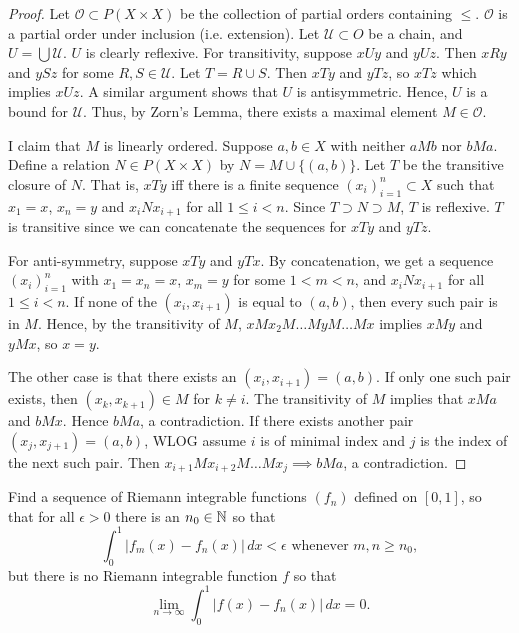\documentclass{article}
\begin{document}
\begin{proof}

Let $\mathcal O \subset P(X \times X)$ be the collection of partial orders containing $\le$. $\mathcal O$ is a partial order under inclusion (i.e. extension).  Let $\mathcal U \subset O$ be a chain, and $U = \bigcup \mathcal U$.  $U$ is clearly reflexive. For transitivity, suppose $xUy$ and $yUz$.  Then $xRy$ and $ySz$ for some $R,S \in \mathcal U$. Let $T = R \cup S$.  Then $xTy$ and $yTz$, so $xTz$ which implies $xUz$.  A similar argument shows that $U$ is antisymmetric. Hence, $U$ is a bound for $\mathcal U$. Thus, by Zorn's Lemma, there exists a maximal element $M \in \mathcal O$. 

I claim that $M$ is linearly ordered.  Suppose $a,b \in X$ with neither $aMb$ nor $bMa$.  Define a relation $N \in P(X \times X)$ by $N = M \cup \{(a,b)\}$.  Let $T$ be the transitive closure of $N$. That is, $xTy$ iff there is a finite sequence $(x_i)_{i=1}^n \subset X$ such that $x_1 = x$, $x_n = y$ and $x_iNx_{i+1}$ for all $1 \le i < n$. Since $T \supset N \supset M$, $T$ is reflexive.  $T$ is transitive since we can concatenate the sequences for $xTy$ and $yTz$. 

For anti-symmetry, suppose $xTy$ and $yTx$.  By concatenation, we get a sequence $(x_i)_{i=1}^n$ with $x_1 = x_n = x$, $x_m = y$ for some $1<m<n$, and $x_iNx_{i+1}$ for all $1 \le i < n$. If none of the $(x_i,x_{i+1})$ is equal to $(a,b)$, then every such pair is in $M$.  Hence, by the transitivity of $M$, $x M x_2 M \ldots M y M \ldots M x$ implies $x M y$ and $y M x$, so $x = y$.  

The other case is that there exists an $(x_i,x_{i+1}) = (a,b)$.  If only one such pair exists, then $(x_k,x_{k+1}) \in M$ for $k \neq i$.  The transitivity of $M$ implies that $xMa$ and $bMx$. Hence $bMa$, a contradiction.  If there exists another pair $(x_j, x_{j+1}) = (a,b)$, WLOG assume $i$ is of minimal index and $j$ is the index of the next such pair.  Then $x_{i+1} M x_{i+2} M \ldots M x_j \implies b M a$, a contradiction.

\end{proof}

 Find a sequence of Riemann integrable functions $(f_n)$ defined on $[0,1]$, so that for all $\epsilon > 0$ there is an $n_0 \in \mathbb{N}$ so that
$$ \int_0^1 |f_m(x) - f_n(x)| \,dx < \epsilon \text{ whenever } m,n \ge n_0, $$
but there is no Riemann integrable function $f$ so that
$$\lim_{n\to \infty} \int_0^1 |f(x) - f_n(x)| \,dx = 0. $$
\end{document}
